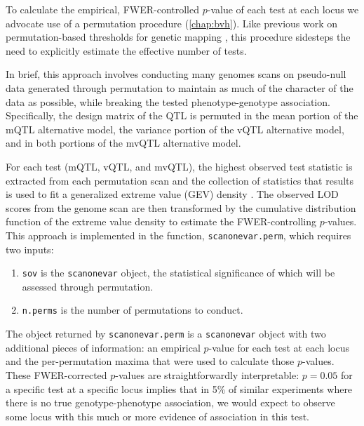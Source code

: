 To calculate the empirical, FWER-controlled $p$-value of each test at each locus we advocate use of a permutation procedure (\autoref{chap:bvh}).
Like previous work on permutation-based thresholds for genetic mapping \citep{Churchill1994,Carlborg2002}, this procedure sidesteps the need to explicitly estimate the effective number of tests.

In brief, this approach involves conducting many genomes scans on pseudo-null data generated through permutation to maintain as much of the character of the data as possible, while breaking the tested phenotype-genotype association.
Specifically, the design matrix of the QTL is permuted in the mean portion of the mQTL alternative model, the variance portion of the vQTL alternative model, and in both portions of the mvQTL alternative model.

For each test (mQTL, vQTL, and mvQTL), the highest observed test statistic is extracted from each permutation scan and the collection of statistics that results is used to fit a generalized extreme value (GEV) density \citep{Stephenson2002,Dudbridge2004,Valdar06cc}.
The observed LOD scores from the genome scan are then transformed by the cumulative distribution function of the extreme value density to estimate the FWER-controlling $p$-values.
This approach is implemented in the function, \texttt{scanonevar.perm}, which requires two inputs:
\begin{enumerate}
	\item \texttt{sov} is the \texttt{scanonevar} object, the statistical significance of which will be assessed through permutation.
	\item \texttt{n.perms} is the number of permutations to conduct.
\end{enumerate}
The object returned by \texttt{scanonevar.perm} is a \texttt{scanonevar} object with two additional pieces of information: an empirical $p$-value for each test at each locus and the per-permutation maxima that were used to calculate those $p$-values.
These FWER-corrected $p$-values are straightforwardly interpretable: $p = 0.05$ for a specific test at a specific locus implies that in 5\% of similar experiments where there is no true genotype-phenotype association, we would expect to observe some locus with this much or more evidence of association in this test.

